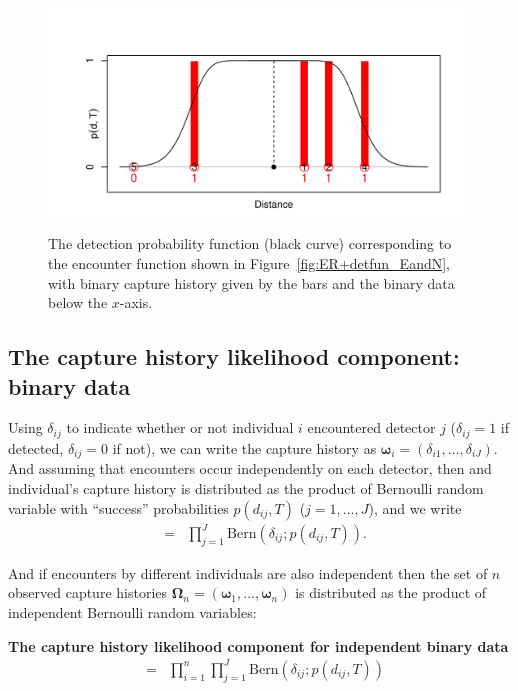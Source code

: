 \documentclass[graybox,envcountchap,sectrefs]{SpringerStyleFiles/styles/svmono}\usepackage[]{graphicx}\usepackage[]{color}
\newcommand{\be}{\begin{eqnarray}}
\newcommand{\ee}{\end{eqnarray}}
\begin{document}
\begin{figure}[ht]
\caption{\small The detection probability function (black curve) corresponding to the encounter function shown in Figure~\ref{fig:ER+detfun_EandN}, with binary capture history given by the bars and the binary data below the $x$-axis.}
\centering
\vspace{-24pt}
\includegraphics[width=11cm]{keepfigure/binp.pdf}
\label{fig:ER+detfun_binp}
\end{figure}


\subsection{The capture history likelihood component: binary data}
\label{subsec:ER+detfun.binarylikelihood}

Using $\delta_{ij}$ to indicate whether or not individual $i$ encountered detector $j$ ($\delta_{ij}=1$ if detected, $\delta_{ij}=0$ if not), we can write the capture history as $\bm{\omega}_i=(\delta_{i1},\ldots,\delta_{iJ})$. And assuming that encounters occur independently on each detector, then and individual's capture history is distributed as the product of Bernoulli random variable with ``success'' probabilities $p(d_{ij},T)$ ($j=1,\ldots,J$), and we write
\be
[\bm{\omega}_i|\bm{s}_i]&=&\prod_{j=1}^J\mbox{Bern}\left(\delta_{ij};p(d_{ij},T)\right).
\ee

And if encounters by different individuals are also independent then the set of $n$ observed capture histories $\bm{\Omega}_n=(\bm{\omega}_1,\ldots,\bm{\omega}_n)$ is  distributed as the product of independent Bernoulli random variables:
\begin{svgraybox}
\bf{The capture history likelihood component for independent binary data}
\be
[\bm{\Omega}_n|\bm{S}_n]&=&\prod_{i=1}^n\prod_{j=1}^J\mbox{Bern}\left(\delta_{ij};p(d_{ij},T)\right)
\label{eq:ER+detfun.P.Omega.binary}
\ee
\end{svgraybox}
\end{document}
